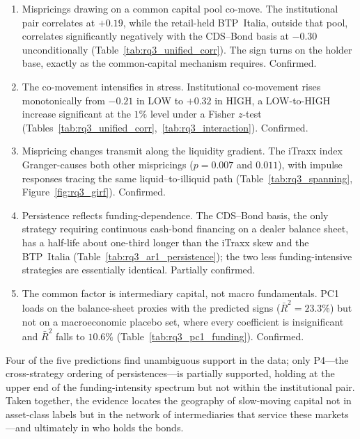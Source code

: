 \begin{enumerate}[label=\textbf{P\arabic*.}, leftmargin=*, itemsep=4pt]

\item Mispricings drawing on a common capital pool co-move. The
  institutional pair correlates at $+0.19$, while the retail-held
  BTP~Italia, outside that pool, correlates significantly negatively
  with the CDS--Bond basis at $-0.30$ unconditionally
  (Table~\ref{tab:rq3_unified_corr}). The sign turns on the holder
  base, exactly as the common-capital mechanism requires. Confirmed.

\item The co-movement intensifies in stress. Institutional co-movement
  rises monotonically from $-0.21$ in LOW to $+0.32$ in HIGH, a
  LOW-to-HIGH increase significant at the $1\%$ level under a
  Fisher $z$-test
  (Tables~\ref{tab:rq3_unified_corr},~\ref{tab:rq3_interaction}).
  Confirmed.

\item Mispricing changes transmit along the liquidity gradient. The iTraxx index Granger-causes
  both other mispricings ($p=0.007$ and $0.011$), with impulse responses tracing the same liquid--to-illiquid path (Table~\ref{tab:rq3_spanning},
  Figure~\ref{fig:rq3_girf}). Confirmed.

\item Persistence reflects funding-dependence. The CDS--Bond basis,
  the only strategy requiring continuous cash-bond financing on a
  dealer balance sheet, has a half-life about one-third longer than
  the iTraxx skew and the BTP~Italia
  (Table~\ref{tab:rq3_ar1_persistence}); the two less
  funding-intensive strategies are essentially identical. Partially
  confirmed.

\item The common factor is intermediary capital, not macro
  fundamentals. PC1 loads on the balance-sheet proxies with the
  predicted signs ($\bar{R}^{2} = 23.3\%$) but not on a
  macroeconomic placebo set, where every coefficient is insignificant
  and $\bar{R}^{2}$ falls to $10.6\%$
  (Table~\ref{tab:rq3_pc1_funding}). Confirmed.

\end{enumerate}

\noindent Four of the five predictions find unambiguous support in
the data; only P4---the cross-strategy ordering of
persistences---is partially supported, holding at the upper end of the
funding-intensity spectrum but not within the institutional pair. Taken together, the evidence locates the geography of
slow-moving capital not in asset-class labels but in the network of
intermediaries that service these markets---and ultimately in who
holds the bonds.